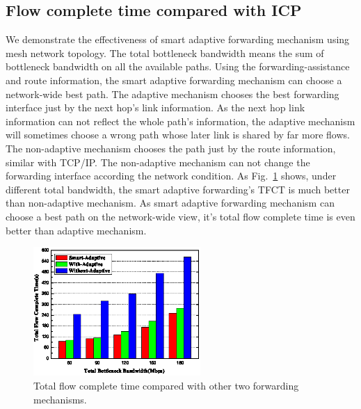 \subsection{Flow complete time compared with ICP}

We demonstrate the effectiveness of smart adaptive forwarding mechanism using mesh network topology. The total bottleneck bandwidth means the sum of bottleneck bandwidth on all the available paths. Using the forwarding-assistance and route information, the smart adaptive forwarding mechanism can choose a network-wide best path. The adaptive mechanism chooses the best forwarding interface just by the next hop's link information. As the next hop link information can not reflect the whole path's information, the adaptive mechanism will sometimes choose a wrong path whose later link is shared by far more flows. The non-adaptive mechanism chooses the path just by the route information, similar with TCP/IP. The non-adaptive mechanism can not change the forwarding interface according the network condition. As Fig.~\ref{fig-tfct} shows, under different total bandwidth, the smart adaptive forwarding's TFCT is much better than non-adaptive mechanism. As smart adaptive forwarding mechanism can choose a best path on the network-wide view, it's total flow complete time is even better than adaptive mechanism.

\begin{figure}[t]
	\centering
	\includegraphics[width=2.5in]{adaptive-pic-cut.eps}
	\caption{Total flow complete time compared with other two forwarding mechanisms.}
	\label{fig-tfct}
\end{figure}
